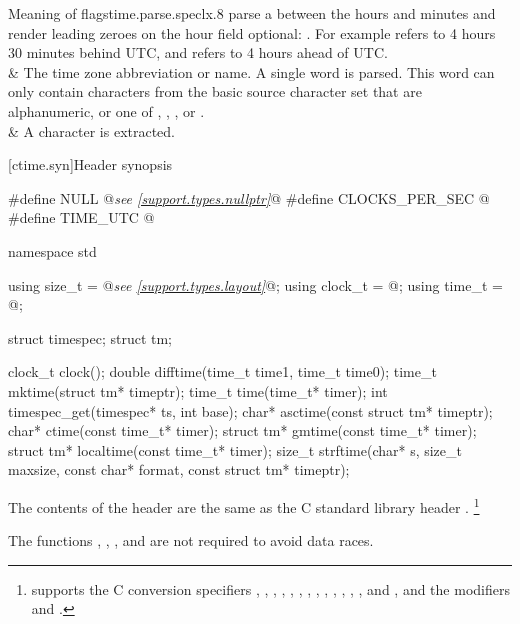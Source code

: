 \begin{LongTable}{Meaning of  flags}{time.parse.spec}{lx{.8\hsize}}
parse a \tcode{:} between the hours and minutes
and render leading zeroes on the hour field optional:
.
For example  refers to 4 hours 30 minutes behind UTC,
and  refers to 4 hours ahead of UTC.
\\ \rowsep
{} &
The time zone abbreviation or name.
A single word is parsed.
This word can only contain characters
from the basic source character set
that are alphanumeric, or one of
, , , or .
\\ \rowsep
\tcode{\%\%} &
A \tcode{\%} character is extracted.
\\
\end{LongTable}


[ctime.syn]{Header  synopsis}

%
%
%
%
%
%
%
%
%
%
%
%
%
%
%
%
%
%
%
\begin{codeblock}
#define NULL @\textit{see \ref{support.types.nullptr}}@
#define CLOCKS_PER_SEC @\seebelow@
#define TIME_UTC @\seebelow@

namespace std {
  using size_t = @\textit{see \ref{support.types.layout}}@;
  using clock_t = @\seebelow@;
  using time_t = @\seebelow@;

  struct timespec;
  struct tm;

  clock_t clock();
  double difftime(time_t time1, time_t time0);
  time_t mktime(struct tm* timeptr);
  time_t time(time_t* timer);
  int timespec_get(timespec* ts, int base);
  char* asctime(const struct tm* timeptr);
  char* ctime(const time_t* timer);
  struct tm* gmtime(const time_t* timer);
  struct tm* localtime(const time_t* timer);
  size_t strftime(char* s, size_t maxsize, const char* format, const struct tm* timeptr);
}
\end{codeblock}

\pnum
The contents of the header  are the same as the C standard library header .%
\footnote{ supports the C conversion specifiers
, , , , , , ,
, , , , , , and
, and the modifiers  and .}

\pnum
The functions , , , and
 are not required to avoid data
races.


